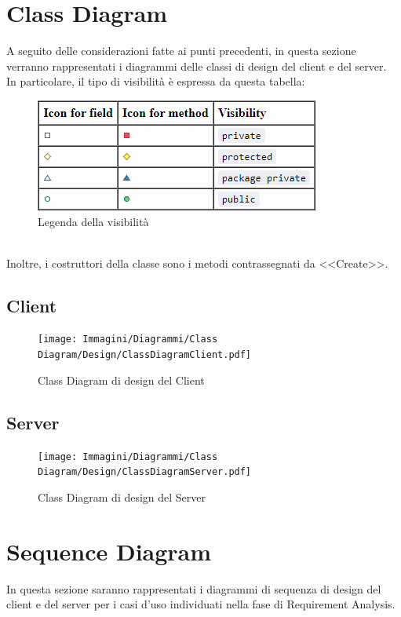     \section{Class Diagram}
        A seguito delle considerazioni fatte ai punti precedenti, in questa sezione verranno rappresentati i diagrammi delle classi di design del client e del server. \\
        In particolare, il tipo di visibilità è espressa da questa tabella:
        \begin{figure}[htbp!]
                \centering
                \includegraphics[width=0.25\linewidth]{Immagini/Diagrammi/Class Diagram/Design/Legend visibility.png}
            \caption{Legenda della visibilità}
            \label{fig:Legenda della visibilità}
        \end{figure}\\
        Inoltre, i costruttori della classe sono i metodi contrassegnati da \textless{}\textless{}Create\textgreater{}\textgreater{}.
    
        \subsection{Client}
            \begin{figure}[htbp!]
                \texttt{[image: Immagini/Diagrammi/Class Diagram/Design/ClassDiagramClient.pdf]}
            \caption{Class Diagram di design del Client}
            \label{fig:Class Diagram di design del Client}
            \end{figure}
    
        \subsection{Server}
            \begin{figure}[htbp!]
                \texttt{[image: Immagini/Diagrammi/Class Diagram/Design/ClassDiagramServer.pdf]}
            \caption{Class Diagram di design del Server}
            \label{fig:Class Diagram di design del Server}
            \end{figure}

    \clearpage
    
    \section{Sequence Diagram}
        In questa sezione saranno rappresentati i diagrammi di sequenza di design del client e del server per i casi d'uso individuati nella fase di Requirement Analysis.
        
